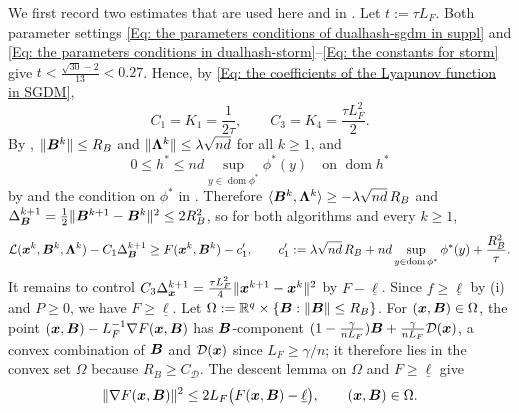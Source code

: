 \begingroup\color{blue}
We first record two estimates that are used here and in .
Let $t:=\tau L_F$. Both parameter settings \eqref{Eq: the parameters conditions of dualhash-sgdm in suppl} and \eqref{Eq: the parameters conditions in dualhash-storm}--\eqref{Eq: the constants for storm} give $t<\frac{\sqrt{30}-2}{13}<0.27$. Hence, by \eqref{Eq: the coefficients of the Lyapunov function in SGDM},
\[
C_1=K_1=\frac{1}{2\tau},\qquad C_3=K_4=\frac{\tau L_F^2}{2}.
\]
By , $\|\bm{B}^k\|\le R_B$ and $\|\bm{\Lambda}^k\|\le\lambda\sqrt{nd}$ for all $k\ge1$, and
\[
0\le h^*\le nd\sup_{y\in\operatorname{dom}\phi^*}\phi^*(y)
\quad\text{on }\operatorname{dom}h^*
\]
by  and the condition on $\phi^*$ in . Therefore $\langle\bm{B}^k,\bm{\Lambda}^k\rangle\ge-\lambda\sqrt{nd}\,R_B$ and $\Delta_{\bm{B}}^{k+1}=\frac12\|\bm{B}^{k+1}-\bm{B}^k\|^2\le2R_B^2$, so for both algorithms and every $k\ge1$,
\begin{equation}
\label{eq:lb-common}
\calL(\bx^k,\bB^k,\bLmbd^k)-C_1\Delta_{\bB}^{k+1}
\ge F(\bx^k,\bB^k)-c_1',
\qquad
c_1':=\lambda\sqrt{nd}\,R_B+nd\sup_{y\in\operatorname{dom}\phi^*}\phi^*(y)+\frac{R_B^2}{\tau}.
\end{equation}
It remains to control $C_3\Delta_{\bm{x}}^{k+1}=\frac{\tau L_F^2}{4}\|\bm{x}^{k+1}-\bm{x}^k\|^2$ by $F-\underline{\ell}$. Since $f\ge\underline{\ell}$ by (i) and $P\ge0$, we have $F\ge\underline{\ell}$. Let $\Omega:=\mathbb{R}^q\times\{\bm{B}:\|\bm{B}\|\le R_B\}$. For $(\bm{x},\bm{B})\in\Omega$, the point $(\bm{x},\bm{B})-L_F^{-1}\nabla F(\bm{x},\bm{B})$ has $\bm{B}$-component $(1-\frac{\gamma}{nL_F})\bm{B}+\frac{\gamma}{nL_F}\mathcal{D}(\bm{x})$, a convex combination of $\bm{B}$ and $\mathcal{D}(\bm{x})$ since $L_F\ge\gamma/n$; it therefore lies in the convex set $\Omega$ because $R_B\ge C_{\mathcal{D}}$. The descent lemma on $\Omega$ and $F\ge\underline{\ell}$ give
\begin{equation}
\label{eq:lb-gradient}
\|\nabla F(\bx,\bB)\|^2\le2L_F\bigl(F(\bx,\bB)-\underline{\ell}\bigr),\qquad(\bx,\bB)\in\Omega .
\end{equation}

